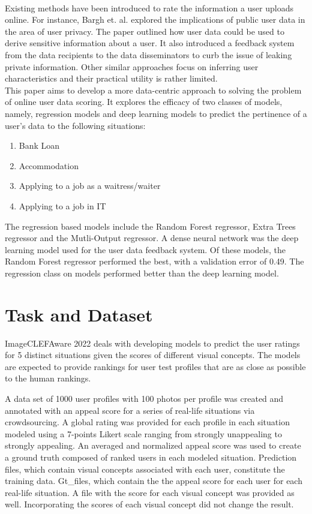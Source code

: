\documentclass{llncs}
\begin{document}
\\Existing methods have been introduced to rate the information a user uploads online. For instance, Bargh et. al. \cite{barghFeedbackSystem} explored the implications of public user data in the area of user privacy. The paper outlined how user data could be used to derive sensitive information about a user. It also introduced a feedback system from the data recipients to the data disseminators to curb the issue of leaking private information. Other similar approaches focus on inferring user characteristics and their practical utility is rather limited. 
\\This paper aims to develop a more data-centric approach to solving the problem of online user data scoring. It explores the efficacy of two classes of models, namely, regression models and deep learning models to predict the pertinence of a user's data to the following situations:
\begin{enumerate}
    \item Bank Loan
    \item Accommodation 
    \item Applying to a job as a waitress/waiter
    \item Applying to a job in IT
\end{enumerate} 
The regression based models include the Random Forest regressor, Extra Trees regressor and the Mutli-Output regressor. A dense neural network was the deep learning model used for the user data feedback system. Of these models, the Random Forest regressor performed the best, with a validation error of 0.49. The regression class on models performed better than the deep learning model.

\vspace{5mm}

\section{Task and Dataset}
ImageCLEFAware 2022 deals with developing models to predict the user ratings for 5 distinct situations given the scores of different visual concepts. The models are expected to provide rankings for user test profiles that are as close as possible to the human rankings.

A data set of 1000 user profiles with 100 photos per profile was created and annotated with an appeal score for a series of real-life situations via crowdsourcing. A global rating was provided for each profile in each situation modeled using a 7-points Likert scale ranging from strongly unappealing to strongly appealing. An averaged and normalized appeal score was used to create a ground truth composed of ranked users in each modeled situation. Prediction files, which contain visual concepts associated with each user, constitute the training data.  Gt\_files, which contain the the appeal score for each user for each real-life situation. A file with the score for each visual concept was provided as well. Incorporating the scores of each visual concept did not change the result.
\end{document}

